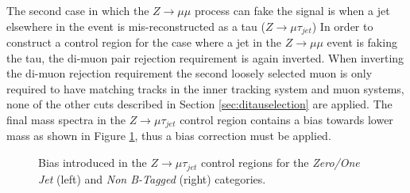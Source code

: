The second case in which the $Z\rightarrow\mu\mu$ process can fake the signal is  when a jet elsewhere in the event is mis-reconstructed as a tau ($Z\rightarrow\mu\tau_{jet}$)
In order to construct a control region for the case where a jet in the $Z\rightarrow\mu\mu$ event is faking the tau, the di-muon pair rejection requirement is again inverted.
When inverting the di-muon rejection requirement the second loosely selected muon is only required to have matching tracks in the inner tracking system and muon systems, none of the other cuts described in Section \ref{sec:ditauselection} are applied.
The final mass spectra in the $Z\rightarrow\mu\tau_{jet}$ control region contains a bias towards lower mass as shown in Figure \ref{fig:zmujetbias}, thus a bias correction must be applied.
\begin{figure}[ht]
\centering
{}
\caption{Bias introduced in the $Z\rightarrow\mu\tau_{jet}$ control regions for the \emph{Zero/One Jet} (left) and \emph{Non B-Tagged} (right) categories.}
\label{fig:zmujetbias}
\end{figure}

